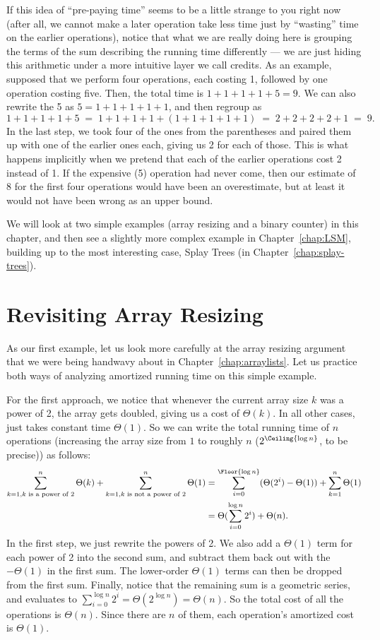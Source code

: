If this idea of ``pre-paying time'' seems to be a little strange to
you right now (after all, we cannot make a later operation take less
time just by ``wasting'' time on the earlier operations),
notice that what we are really doing here is grouping the terms of the
sum describing the running time differently --- we are just hiding
this arithmetic under a more intuitive layer we call credits.
As an example, supposed that we perform four operations, each costing 1,
followed by one operation costing five.
Then, the total time is $1+1+1+1+5 = 9$.
We can also rewrite the 5 as $5=1+1+1+1+1$,
and then regroup as 
\[ 1+1+1+1+5 \; = \;
1+1+1+1+(1+1+1+1+1) \; = \;
2+2+2+2+1 \; = \; 9.\]
In the last step, we took four of the ones from the parentheses and
paired them up with one of the earlier ones each, giving us 2 for each
of those. This is what happens implicitly when we pretend that each of
the earlier operations cost 2 instead of 1. 
If the expensive (5) operation had never come, then our estimate of 8
for the first four operations would have been an overestimate,
but at least it would not have been wrong as an upper bound.

We will look at two simple examples (array resizing and a binary
counter) in this chapter, and then see a slightly more complex example
in Chapter~\ref{chap:LSM}, building up to the most
interesting case, Splay Trees (in Chapter~\ref{chap:splay-trees}).

\section{Revisiting Array Resizing}
As our first example, let us look more carefully at the array resizing
argument that we were being handwavy about in
Chapter~\ref{chap:arraylists}.
Let us practice both ways of analyzing amortized running time on this simple example.

For the first approach, we notice that whenever the current array size
$k$ was a power of 2,
the array gets doubled, giving us a cost of $\Theta(k)$.
In all other cases,  just takes constant time $\Theta(1)$.
So we can write the total running time of $n$ operations (increasing
the array size from $1$ to roughly $n$ 
($2^{\Ceiling{\log n}}$, to be precise)) as follows:
\begin{align*}
\sum_{k=1,\text{$k$ is a power of 2}}^n \Theta(k) + 
\sum_{k=1,\text{$k$ is not a power of 2}}^n \Theta(1)
& = 
\sum_{i=0}^{\Floor{\log n}} (\Theta(2^i) - \Theta(1))
+ \sum_{k=1}^n \Theta(1)\\
& = \Theta(\sum_{i=0}^{\log n} 2^i) + \Theta(n).
\end{align*}
In the first step, we just rewrite the powers of 2. 
We also add a $\Theta(1)$ term for each power of 2 into the second sum,
and subtract them back out with the $-\Theta(1)$ in the first sum. 
The lower-order $\Theta(1)$ terms can then be dropped from the first sum.
Finally, notice that the remaining sum is a geometric series,
and evaluates to 
$\sum_{i=0}^{\log n} 2^i = \Theta(2^{\log n}) = \Theta(n)$. 
So the total cost of all the  operations is $\Theta(n)$. 
Since there are $n$ of them,
each operation's amortized cost is $\Theta(1)$.

